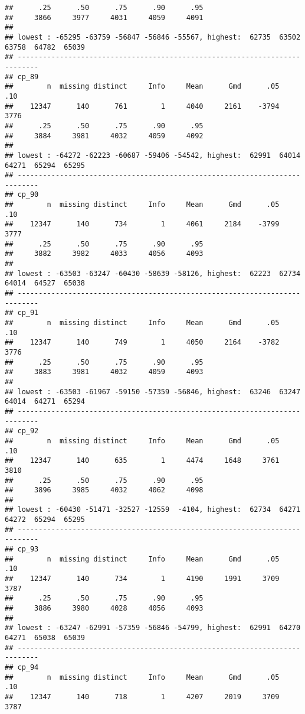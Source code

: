 \documentclass[]{article}
\begin{document}
\begin{verbatim}
##      .25      .50      .75      .90      .95 
##     3866     3977     4031     4059     4091 
## 
## lowest : -65295 -63759 -56847 -56846 -55567, highest:  62735  63502  63758  64782  65039
## ---------------------------------------------------------------------------
## cp_89 
##        n  missing distinct     Info     Mean      Gmd      .05      .10 
##    12347      140      761        1     4040     2161    -3794     3776 
##      .25      .50      .75      .90      .95 
##     3884     3981     4032     4059     4092 
## 
## lowest : -64272 -62223 -60687 -59406 -54542, highest:  62991  64014  64271  65294  65295
## ---------------------------------------------------------------------------
## cp_90 
##        n  missing distinct     Info     Mean      Gmd      .05      .10 
##    12347      140      734        1     4061     2184    -3799     3777 
##      .25      .50      .75      .90      .95 
##     3882     3982     4033     4056     4093 
## 
## lowest : -63503 -63247 -60430 -58639 -58126, highest:  62223  62734  64014  64527  65038
## ---------------------------------------------------------------------------
## cp_91 
##        n  missing distinct     Info     Mean      Gmd      .05      .10 
##    12347      140      749        1     4050     2164    -3782     3776 
##      .25      .50      .75      .90      .95 
##     3883     3981     4032     4059     4093 
## 
## lowest : -63503 -61967 -59150 -57359 -56846, highest:  63246  63247  64014  64271  65294
## ---------------------------------------------------------------------------
## cp_92 
##        n  missing distinct     Info     Mean      Gmd      .05      .10 
##    12347      140      635        1     4474     1648     3761     3810 
##      .25      .50      .75      .90      .95 
##     3896     3985     4032     4062     4098 
## 
## lowest : -60430 -51471 -32527 -12559  -4104, highest:  62734  64271  64272  65294  65295
## ---------------------------------------------------------------------------
## cp_93 
##        n  missing distinct     Info     Mean      Gmd      .05      .10 
##    12347      140      734        1     4190     1991     3709     3787 
##      .25      .50      .75      .90      .95 
##     3886     3980     4028     4056     4093 
## 
## lowest : -63247 -62991 -57359 -56846 -54799, highest:  62991  64270  64271  65038  65039
## ---------------------------------------------------------------------------
## cp_94 
##        n  missing distinct     Info     Mean      Gmd      .05      .10 
##    12347      140      718        1     4207     2019     3709     3787 

\end{verbatim}
\end{document}
